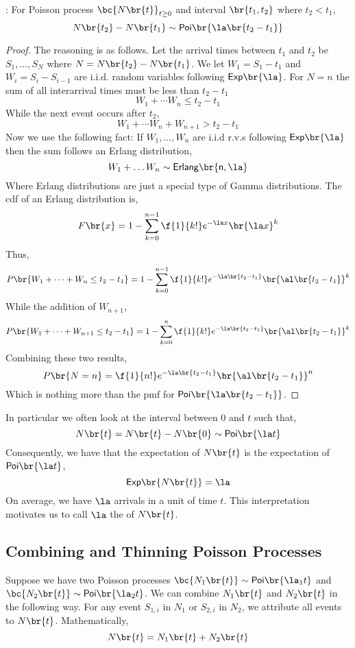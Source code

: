\documentclass{article}
\newcommand{\Poi}{\mathsf{Poi}}
\newcommand{\Ex}{\mathsf{Exp}}
\begin{document}
    \begin{theorem}
        : For Poisson process $\bc{N\br{t}}_{t \geq 0}$ and interval $\br{t_1, t_2}$ where $t_2 < t_1$,
        \[ N\br{t_2} - N\br{t_1} \sim \Poi\br{\la\br{t_2 - t_1}} \]
    \end{theorem}
    \begin{proof}
    The reasoning is as follows. Let the arrival times between $t_1$ and $t_2$ be $S_1, \ldots, S_N$ where $N = N\br{t_2} - N\br{t_1}$. We let $W_1 = S_1 - t_1$ and $W_i = S_i - S_{i-1}$ are i.i.d. random variables following $\Ex\br{\la}$. For $N = n$ the sum of all interarrival times must be less than $t_2 - t_1$
    \[ W_1 + \cdots W_n \leq t_2 - t_1 \]
    While the next event occurs after $t_2$,
    \[ W_1 + \cdots W_n + W_{n+1} > t_2 - t_1 \]
    Now we use the following fact: If $W_1, \ldots, W_n$ are i.i.d r.v.s following $\Ex\br{\la}$ then the sum follows an Erlang distribution,
    \[ W_1 + \ldots W_n \sim \sf{Erlang}\br{n ,\la}  \]
    Where Erlang distributions are just a special type of Gamma distributions. The cdf of an Erlang distribution is,
    \[ F\br{x} = 1 - \sum_{k=0}^{n-1} \f{1}{k!} e^{- \la x} \br{\la x}^{k} \]
    Thus,
    \[ P\br{W_1 + \cdots + W_n \leq t_2 - t_1} = 1 - \sum_{k=0}^{n-1} \f{1}{k!} e^{-\la \br{t_2 - t_1}} \br{\al \br{t_2 - t_1}}^k \]
    While the addition of $W_{n+1}$,
    \[ P\br{W_1 + \cdots + W_{n+1} \leq t_2 - t_1} = 1 - \sum_{k=0}^{n} \f{1}{k!} e^{-\la \br{t_2 - t_1}} \br{\al \br{t_2 - t_1}}^k \]
    Combining these two results,
    \[ P\br{N=n} = \f{1}{n!} e^{-\la \br{t_2 - t_1}} \br{\al \br{t_2 - t_1}}^n \]
    Which is nothing more than the pmf for $\Poi\br{\la\br{t_2 - t_1}}$.
    \end{proof}
    In particular we often look at the interval between $0$ and $t$ such that,
    \[ N\br{t} = N\br{t} - N\br{0} \sim \Poi\br{\la t} \]
    Consequently, we have that the expectation of $N\br{t}$ is the expectation of $\Poi\br{\la t}$,
    \[ \Ex\br{N\br{t}} = \la \]
    On average, we have $\la$ arrivals in a unit of time $t$. This interpretation motivates us to call $\la$ the  of $N\br{t}$.\\

    \subsection{Combining and Thinning Poisson Processes}

    Suppose we have two Poisson processes $\bc{N_1\br{t}} \sim \Poi \br{\la_1 t}$ and $\bc{N_2\br{t}} \sim \Poi \br{\la_2 t}$. We can combine $N_1\br{t}$ and $N_2\br{t}$ in the following way. For any event $S_{1,i}$ in $N_1$ or $S_{2,i}$ in $N_2$, we attribute all events to $N\br{t}$. Mathematically,
    \[ N\br{t} = N_1\br{t} + N_2\br{t} \]
\end{document}
